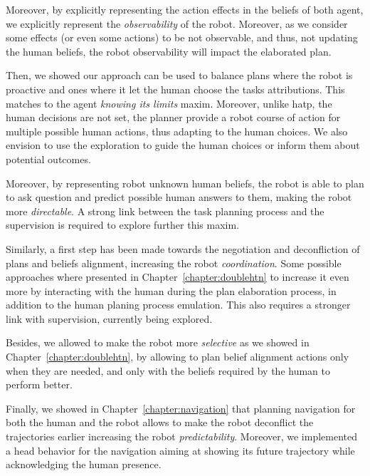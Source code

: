 \documentclass[a4paper,11pt,twoside]{StyleThese}
\begin{document}
Moreover, by explicitly representing the action effects in the beliefs of both agent, we explicitly represent the \textit{observability} of the robot. Moreover, as we consider some effects (or even some actions) to be not observable, and thus, not updating the human beliefs, the robot observability will impact the elaborated plan.

Then, we showed our approach can be used to balance plans where the robot is proactive and ones where it let the human choose the tasks attributions. This matches to the agent \textit{knowing its limits} maxim. Moreover, unlike \acrshort{hatp}, the human decisions are not set, the planner provide a robot course of action for multiple possible human actions, thus adapting to the human choices. We also envision to use the  exploration to guide the human choices or inform them about potential outcomes.

Moreover, by representing robot unknown human beliefs, the robot is able to plan to ask question and predict possible human answers to them, making the robot more \textit{directable}. A strong link between the task planning process and the supervision is required to explore further this maxim.

Similarly, a first step has been made towards the negotiation and deconfliction of plans and beliefs alignment, increasing the robot \textit{coordination}. Some possible approaches where presented in Chapter~\ref{chapter:doublehtn} to increase it even more by interacting with the human during the plan elaboration process, in addition to the human planing process emulation. This also requires a stronger link with supervision, currently being explored.

Besides, we allowed to make the robot more \textit{selective} as we showed in Chapter~\ref{chapter:doublehtn}, by allowing to plan belief alignment actions only when they are needed, and only with the beliefs required by the human to perform better.

Finally, we showed in Chapter~\ref{chapter:navigation} that planning navigation for both the human and the robot allows to make the robot deconflict the trajectories earlier increasing the robot \textit{predictability}. Moreover, we implemented a head behavior for the navigation aiming at showing its future trajectory while acknowledging the human presence.
\end{document}
